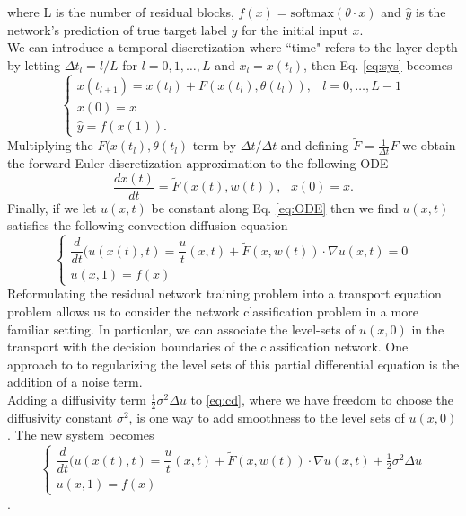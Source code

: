 \documentclass[12pt]{article}
\begin{document}
where L is the number of residual blocks, $f(x) = \text{softmax}(\theta \cdot x)$ and $\hat y$ is the network's prediction of true target label $y$ for the initial input $x$. \\
\indent We can introduce a temporal discretization where ``time" refers to the layer depth by letting $\Delta t_l = l/L$ for $l=0,1,\dots,L$ and $x_l = x(t_l)$, then Eq. \ref{eq:sys} becomes
\begin{equation} \begin{cases}
x(t_{l+1}) = x(t_l) + F(x(t_l),\theta(t_l)), & l=0,\dots,L-1 \\
x(0) = x \\
\hat y = f(x(1)).
\end{cases} \end{equation}
Multiplying the $F(x(t_l),\theta(t_l)$ term by $\Delta t/\Delta t$ and defining $\tilde{F} = \frac{1}{\Delta t} F$ we obtain the forward Euler discretization approximation to the following ODE
\begin{equation}
  \dfrac{dx(t)}{dt} = \tilde{F}(x(t),w(t)),\text{   }  x(0) = x.
  \label{eq:ODE}
\end{equation}
Finally, if we let $u(x,t)$ be constant along Eq. \ref{eq:ODE} then we find  $u(x,t)$ satisfies the following convection-diffusion equation
\begin{equation}
  \begin{cases}
  \dfrac{d}{dt}(u(x(t),t) = \dfrac{u}{t}(x,t) + \tilde{F}(x,w(t))\cdot\nabla u(x,t) = 0 \\
  u(x,1) = f(x)
\end{cases}
  \label{eq:cd}
\end{equation}
Reformulating the residual network training problem into a transport equation problem allows us to consider the network classification problem in a more familiar setting. In particular, we can associate the level-sets of $u(x,0)$ in the transport with the decision boundaries of the classification network. One approach to to regularizing the level sets of this partial differential equation is the addition of a noise term. \\
Adding a diffusivity term $\frac{1}{2}\sigma^2\Delta u$ to \ref{eq:cd}, where we have freedom to choose the diffusivity constant $\sigma^2$, is one way to add smoothness to the level sets of $u(x,0)$. The new system becomes
  \begin{equation}
    \begin{cases}
    \dfrac{d}{dt}(u(x(t),t) = \dfrac{u}{t}(x,t) + \tilde{F}(x,w(t))\cdot\nabla u(x,t) + \frac{1}{2}\sigma^2\Delta u \\
    u(x,1) = f(x)
  \end{cases}
\end{equation}.
\end{document}

